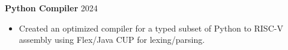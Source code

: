 \textbf{Python Compiler} \hfill 2024 \par
\begin{itemize}
\item Created an optimized compiler for a typed subset of Python to RISC-V assembly using Flex/Java CUP for lexing/parsing.
\end{itemize} \par
